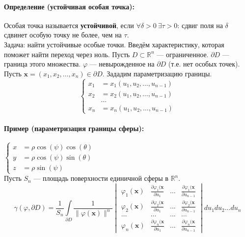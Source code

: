 \paragraph{Определение (устойчивая особая точка):} Особая точка называется \textbf{устойчивой}, если $\forall \delta > 0 \ \exists \tau > 0$: сдвиг поля на $\delta$ сдвинет особую точку не более, чем на $\tau$.
\\

Задача: найти устойчивые особые точки.
Введём характеристику, которая поможет найти переход через ноль.
Пусть $D \subset \mathbb{R}^n$ --- ограниченное. $\partial D$ --- граница этого множества. $\varphi$ --- невырожденное на $\partial D$ (т.е. нет особых точек).
Пусть $\mathbf{x}=(x_1,x_2,\hdots,x_n) \in \partial D$. Зададим параметризацию границы.
\[
	\left\{
	\begin{aligned}
		x_1 & = x_1(u_1, u_2, \dots, u_{n-1}) \\
		x_2 & = x_2(u_1, u_2, \dots, u_{n-1}) \\
		    & \hdots                          \\
		x_n & = x_n(u_1, u_2, \dots, u_{n-1}) 
	\end{aligned}
	\right.
\]
\paragraph{Пример (параметризация границы сферы):} $\left\{
\begin{aligned}
	x & = \rho \cos(\psi) \cos(\theta) \\
	y & = \rho \cos(\psi) \sin(\theta) \\
	z & = \rho \sin(\psi)              
\end{aligned}
\right.$
\\

Пусть $S_n$ --- площадь поверхности единичной сферы в $\mathbb{R}^n$.
\[
	\gamma(\varphi, \partial D) = \frac{1}{S_n} \int\limits_{\partial D} \frac{1}{\|\varphi(\mathbf{x})\|^n} \begin{vmatrix} \varphi_1(\mathbf{x}) & \frac{\partial \varphi_1(\mathbf{x}}{\partial u_1}  &\hdots & \frac{\partial \varphi_1(\mathbf{x}}{\partial u_{n-1}} \\ \varphi_2(\mathbf{x}) & \frac{\partial \varphi_2(\mathbf{x}}{\partial u_1}  &\hdots & \frac{\partial \varphi_2(\mathbf{x}}{\partial u_{n-1}} \\ \hdots & \hdots & \hdots & \hdots \\ \varphi_n(\mathbf{x}) & \frac{\partial \varphi_n(\mathbf{x}}{\partial u_1}  &\hdots & \frac{\partial \varphi_n(\mathbf{x}}{\partial u_{n-1}} \end{vmatrix} du_1du_2\hdots du_n
\]
